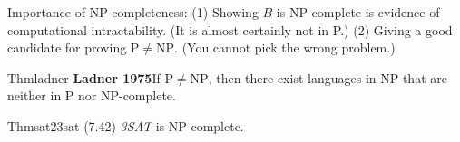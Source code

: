 
Importance of NP-completeness: (1) Showing $B$ is NP-complete is evidence of computational intractability. (It is almost certainly not in P.) (2) Giving a good candidate for proving $\mathrm{P}\neq \mathrm{NP}$. (You cannot pick the wrong problem.)

\begin{reference}{Thm}{ladner}
  \textbf{Ladner 1975}\quad If $\mathrm{P}\neq \mathrm{NP}$, then there exist languages in NP that are neither in P nor NP-complete.
\end{reference}

\begin{reference}{Thm}{sat23sat}
  (7.42) \textit{3SAT} is NP-complete.
\end{reference}


